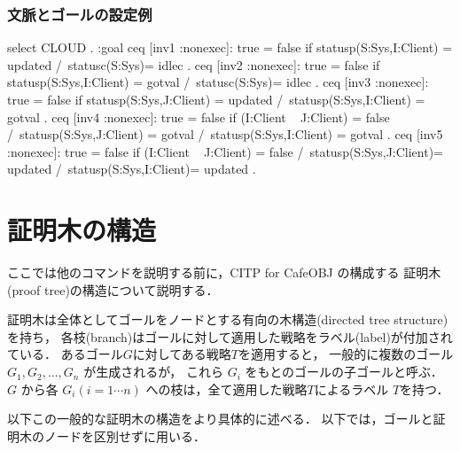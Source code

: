 \documentclass[a4paper,oneside,10pt,here]{memoir}
\newenvironment{vvtm}%
{\parskip=0pt\lineskip=0pt\begin{center}\begin{minipage}{0.8\textwidth}\begin{snugshade}}%
  {\end{snugshade}\end{minipage}\end{center}}
\begin{document}
\subsubsection{文脈とゴールの設定例}
\begin{vvtm}
  \begin{simplev}
 select CLOUD . 
 :goal {
  ceq [inv1 :nonexec]: true = false if statusp(S:Sys,I:Client) = updated /\
                                        statusc(S:Sys)= idlec .
  ceq [inv2 :nonexec]: true = false if statusp(S:Sys,I:Client) = gotval /\ 
                                       statusc(S:Sys)= idlec .
  ceq [inv3 :nonexec]: true = false if statusp(S:Sys,J:Client) = updated /\
                                       statusp(S:Sys,I:Client) = gotval .
  ceq [inv4 :nonexec]: true = false if (I:Client ~ J:Client) = false /\
                                       statusp(S:Sys,J:Client) = gotval /\ 
                                       statusp(S:Sys,I:Client) = gotval .
  ceq [inv5 :nonexec]: true = false if (I:Client ~ J:Client) = false /\
       statusp(S:Sys,J:Client)= updated /\ statusp(S:Sys,I:Client)= updated .}
  \end{simplev}
\end{vvtm}

\section{証明木の構造}\label{sec:proof-struct}
ここでは他のコマンドを説明する前に，CITP for CafeOBJ の構成する
証明木(proof tree)の構造について説明する．

証明木は全体としてゴールをノードとする有向の木構造(directed tree structure)を持ち，
各枝(branch)はゴールに対して適用した戦略をラベル(label)が付加されている．
あるゴール$G$に対してある戦略$T$を適用すると，
一般的に複数のゴール$G_1, G_2, \ldots, G_n$ が生成されるが，
これら $G_i$ をもとのゴールの子ゴールと呼ぶ．
$G$ から各 $G_i (i = 1 \cdots n)$ への枝は，全て適用した戦略$T$によるラベル $T$を持つ．

以下この一般的な証明木の構造をより具体的に述べる．
以下では，ゴールと証明木のノードを区別せずに用いる．
\end{document}
